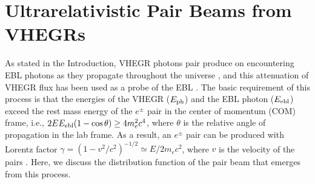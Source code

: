 \documentclass[usenatbib,iop,apj,numberedappendix]{aeb_emulateapj_2015}
\newcommand\ac[1]{{\color{green} \bf #1}} %
\newcommand\bmath[1] {\mbox{\boldmath$\rm #1$}}
\newcommand{\epm}{\ensuremath{e^{\pm}}}
\begin{document}


\section{Ultrarelativistic Pair Beams from VHEGRs}\label{sec:setup}

As stated in the Introduction, VHEGR photons pair produce on encountering EBL
photons as they propagate throughout the universe \citep{Gould+66}, and this
attenuation of VHEGR flux has been used as a probe of the EBL
\citep{Stec-deJa-Sala:92,deJa-Stec-Sala:94,Ahar_etal:06}.  The basic requirement
of this process is that the energies of the VHEGR ($E_{\rm ph}$) and the EBL
photon ($E_{\rm ebl}$) exceed the rest mass energy of the $\epm$ pair in the
center of momentum (COM) frame, i.e., $2 E E_{\rm ebl}(1-\cos\theta) \geq 4
m_e^2 c^4$, where $\theta$ is the relative angle of propagation in the lab
frame. As a result, an $\epm$ pair can be produced with Lorentz factor $\gamma = \left(1-v^2/c^2\right)^{-1/2} \simeq E/2m_e
c^2$, where $v$ is the velocity of the pairs \citep{Goul-Schr:67}.  Here, we discuss the distribution function of the
pair beam that emerges from this process.
\end{document}
